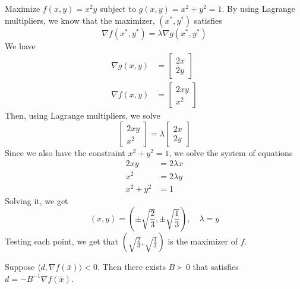 \begin{problem}
  Maximize $f(x,y) = x^2 y$ subject to $g(x,y) = x^2 + y^2 = 1$. By using Lagrange multipliers, we know that the maximizer, $(x^*, y^*)$ satisfies $$\nabla f(x^*, y^*) = \lambda \nabla g(x^*, y^*)$$ We have 
  \begin{align*}
    \nabla g(x,y) &= \begin{bmatrix} 2x \\ 2y \end{bmatrix} \\
    \nabla f(x,y) &= \begin{bmatrix} 2xy \\ x^2 \end{bmatrix}
  \end{align*} Then, using Lagrange multipliers, we solve
  $$\begin{bmatrix} 2xy \\ x^{2} \end{bmatrix} = \lambda \begin{bmatrix} 2x \\ 2y \end{bmatrix}$$ Since we also have the constraint $x^2 + y^2 = 1$, we solve the system of equations
  \begin{align*}
    2xy &= 2\lambda x \\
    x^2 &= 2\lambda y \\
    x^2 + y^2 &= 1
  \end{align*}
  Solving it, we get $$(x, y) = \left(\pm \sqrt{\frac{2}{3}}, \pm \sqrt{\frac{1}{3}}\right), \quad \lambda = y$$
  Testing each point, we get that $\left(\sqrt{\frac{2}{3}}, \sqrt{\frac{1}{3}}\right)$ is the maximizer of $f$.
\end{problem}
\begin{proposition}
  Suppose $\langle d, \nabla f(\bar x) \rangle < 0$. Then there exists $B \succ 0$ that satisfies $d = -B^{-1} \nabla f(\bar x)$. 
\end{proposition}

